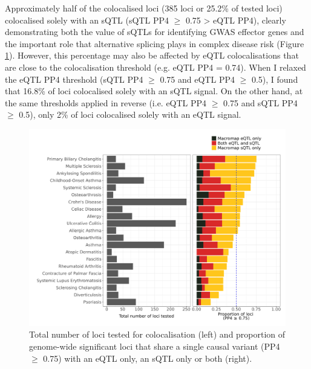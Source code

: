 Approximately half of the colocalised loci (385 loci or 25.2\% of tested loci) colocalised solely with an sQTL (sQTL PP4 $\geq$ 0.75 > eQTL PP4), clearly demonstrating both the value of sQTLs for identifying GWAS effector genes and the important role that alternative splicing plays in complex disease risk (Figure \ref{fig:macromap_esqtl_total_loci}). However, this percentage may also be affected by eQTL colocalisations that are close to the colocalisation threshold (e.g. eQTL PP4 = 0.74). When I relaxed the eQTL PP4 threshold (sQTL PP4 $\geq$ 0.75 and eQTL PP4 $\geq$ 0.5), I found that 16.8\% of loci colocalised solely with an sQTL signal.  On the other hand, at the same thresholds applied in reverse (i.e. eQTL PP4 $\geq$ 0.75 and sQTL PP4 $\geq$ 0.5), only 2\% of loci colocalised solely with an eQTL signal.\\
\begin{figure}[H]
  \centering
  \includegraphics[width=\textwidth]{macromap_esqtl_total_loci}
  \caption[Colocalisation analysis results across 21 immune-mediated diseases]{Total number of loci tested for colocalisation (left) and proportion of genome-wide significant loci that share a single causal variant (PP4 $\geq$ 0.75) with an eQTL only, an sQTL only or both (right).}
  \label{fig:macromap_esqtl_total_loci}   
\end{figure}
